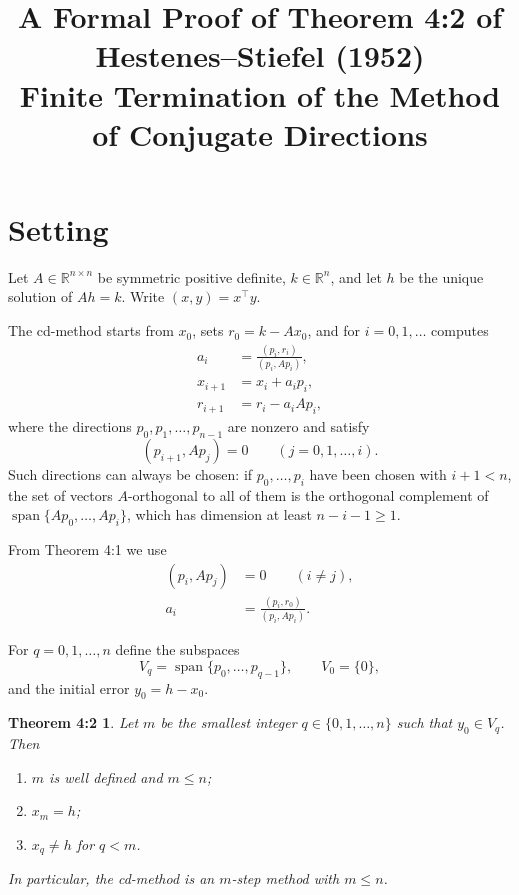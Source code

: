 \documentclass[11pt]{article}
\title{A Formal Proof of Theorem 4:2 of Hestenes--Stiefel (1952)\\
\large Finite Termination of the Method of Conjugate Directions}
\date{}
\newtheorem*{theorem}{Theorem 4:2}
\begin{document}
\maketitle

\section*{Setting}

Let $A \in \mathbb{R}^{n\times n}$ be symmetric positive definite, $k \in \mathbb{R}^n$,
and let $h$ be the unique solution of $Ah = k$. Write $(x,y) = x^{\top}y$.

The cd-method starts from $x_0$, sets $r_0 = k - Ax_0$, and for $i = 0, 1, \dots$ computes
\begin{align}
a_i &= \frac{(p_i, r_i)}{(p_i, Ap_i)}, \tag{4:1a}\\
x_{i+1} &= x_i + a_i p_i, \tag{4:1b}\\
r_{i+1} &= r_i - a_i A p_i, \tag{4:1c}
\end{align}
where the directions $p_0, p_1, \dots, p_{n-1}$ are nonzero and satisfy
\begin{equation}
(p_{i+1}, A p_j) = 0 \qquad (j = 0, 1, \dots, i). \tag{4:2}
\end{equation}
Such directions can always be chosen: if $p_0, \dots, p_i$ have been chosen with $i+1 < n$,
the set of vectors $A$-orthogonal to all of them is the orthogonal complement of
$\operatorname{span}\{Ap_0, \dots, Ap_i\}$, which has dimension at least $n - i - 1 \ge 1$.

From Theorem 4:1 we use
\begin{align}
(p_i, Ap_j) &= 0 \qquad (i \neq j), \tag{4:3a}\\
a_i &= \frac{(p_i, r_0)}{(p_i, Ap_i)}. \tag{4:4}
\end{align}

For $q = 0, 1, \dots, n$ define the subspaces
\[
V_q = \operatorname{span}\{p_0, \dots, p_{q-1}\}, \qquad V_0 = \{0\},
\]
and the initial error $y_0 = h - x_0$.

\begin{theorem}
Let $m$ be the smallest integer $q \in \{0, 1, \dots, n\}$ such that $y_0 \in V_q$. Then
\begin{enumerate}
\item[\textup{(i)}] $m$ is well defined and $m \le n$;
\item[\textup{(ii)}] $x_m = h$;
\item[\textup{(iii)}] $x_q \neq h$ for $q < m$.
\end{enumerate}
In particular, the cd-method is an $m$-step method with $m \le n$.
\end{theorem}
\end{document}
